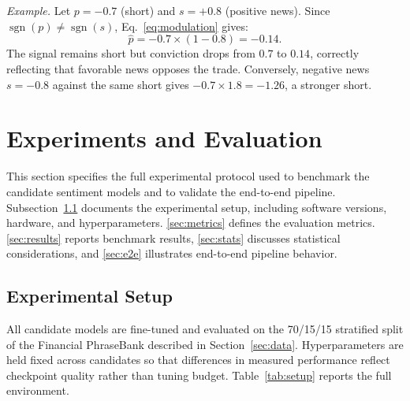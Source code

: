 \documentclass[conference]{IEEEtran}
\begin{document}
\smallskip
\noindent\textit{Example.} Let $p = -0.7$ (short) and $s = +0.8$ (positive
news). Since $\operatorname{sgn}(p) \neq \operatorname{sgn}(s)$,
Eq.~\eqref{eq:modulation} gives:
\[
  \hat{p} = -0.7 \times (1 - 0.8) = -0.14.
\]
The signal remains short but conviction drops from $0.7$ to $0.14$,
correctly reflecting that favorable news opposes the trade. Conversely,
negative news $s = -0.8$ against the same short gives $-0.7 \times 1.8 =
-1.26$, a stronger short.

\section{Experiments and Evaluation}

This section specifies the full experimental protocol used to benchmark the
candidate sentiment models and to validate the end-to-end pipeline.
Subsection~\ref{sec:setup} documents the experimental setup, including
software versions, hardware, and hyperparameters. \ref{sec:metrics} defines
the evaluation metrics. \ref{sec:results} reports benchmark results,
\ref{sec:stats} discusses statistical considerations, and
\ref{sec:e2e} illustrates end-to-end pipeline behavior.

\subsection{Experimental Setup}
\label{sec:setup}

All candidate models are fine-tuned and evaluated on the 70/15/15 stratified
split of the Financial PhraseBank described in Section~\ref{sec:data}.
Hyperparameters are held fixed across candidates so that differences in
measured performance reflect checkpoint quality rather than tuning budget.
Table~\ref{tab:setup} reports the full environment.
\end{document}
